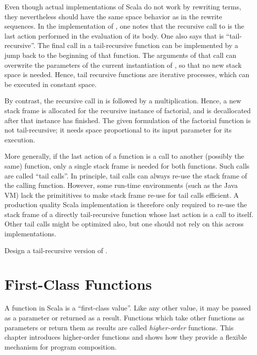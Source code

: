 Even though actual implementations of Scala do not work by rewriting
terms, they nevertheless should have the same space behavior as in the
rewrite sequences. In the implementation of , one notes that
the recursive call to  is the last action performed in the
evaluation of its body. One also says that  is
``tail-recursive''. The final call in a tail-recursive function can be
implemented by a jump back to the beginning of that function. The
arguments of that call can overwrite the parameters of the current
instantiation of , so that no new stack space is needed.
Hence, tail recursive functions are iterative processes, which can be
executed in constant space.

By contrast, the recursive call in  is followed by a
multiplication.  Hence, a new stack frame is allocated for the
recursive instance of factorial, and is decallocated after that
instance has finished. The given formulation of the factorial function
is not tail-recursive; it needs space proportional to its input
parameter for its execution.

More generally, if the last action of a function is a call to another
(possibly the same) function, only a single stack frame is needed for
both functions. Such calls are called ``tail calls''. In principle,
tail calls can always re-use the stack frame of the calling function.
However, some run-time environments (such as the Java VM) lack the
primititives to make stack frame re-use for tail calls efficient.  A
production quality Scala implementation is therefore only required to
re-use the stack frame of a directly tail-recursive function whose
last action is a call to itself.  Other tail calls might be optimized
also, but one should not rely on this across implementations.

\begin{exercise} Design a tail-recursive version of
.
\end{exercise}

\chapter{\label{chap:first-class-funs}First-Class Functions}

A function in Scala is a ``first-class value''. Like any other value,
it may be passed as a parameter or returned as a result.  Functions
which take other functions as parameters or return them as results are
called {\em higher-order} functions. This chapter introduces
higher-order functions and shows how they provide a flexible mechanism
for program composition.

